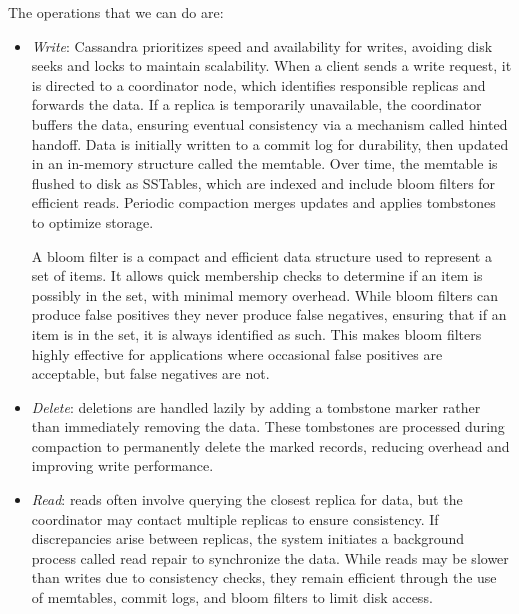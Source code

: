 The operations that we can do are: 
\begin{itemize}
    \item \textit{Write}: Cassandra prioritizes speed and availability for writes, avoiding disk seeks and locks to maintain scalability.
    When a client sends a write request, it is directed to a coordinator node, which identifies responsible replicas and forwards the data. 
        If a replica is temporarily unavailable, the coordinator buffers the data, ensuring eventual consistency via a mechanism called hinted handoff.
        Data is initially written to a commit log for durability, then updated in an in-memory structure called the memtable. 
        Over time, the memtable is flushed to disk as SSTables, which are indexed and include bloom filters for efficient reads. 
        Periodic compaction merges updates and applies tombstones to optimize storage.
    
        A bloom filter is a compact and efficient data structure used to represent a set of items. 
        It allows quick membership checks to determine if an item is possibly in the set, with minimal memory overhead.
        While bloom filters can produce false positives they never produce false negatives, ensuring that if an item is in the set, it is always identified as such. 
        This makes bloom filters highly effective for applications where occasional false positives are acceptable, but false negatives are not.
    \item \textit{Delete}: deletions are handled lazily by adding a tombstone marker rather than immediately removing the data. 
        These tombstones are processed during compaction to permanently delete the marked records, reducing overhead and improving write performance.
    \item \textit{Read}: reads often involve querying the closest replica for data, but the coordinator may contact multiple replicas to ensure consistency. 
        If discrepancies arise between replicas, the system initiates a background process called read repair to synchronize the data. 
        While reads may be slower than writes due to consistency checks, they remain efficient through the use of memtables, commit logs, and bloom filters to limit disk access.
\end{itemize}

